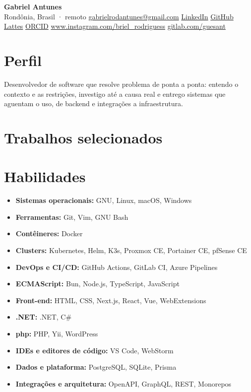 \documentclass[a4paper,10pt]{article}
\begin{document}
\begin{center}
    {\LARGE \textbf{Gabriel Antunes}}
    \\ [0.1cm]
    Rondônia, Brasil · remoto
    {\textbullet}
    \href{mailto:gabrielrodantunes@gmail.com}{gabrielrodantunes@gmail.com}
    {\textbullet}
    \href{https://linkedin.com/in/gabrielrodantunes}{LinkedIn}
    {\textbullet}
    \href{https://github.com/guesant}{GitHub}
    {\textbullet}
    \href{http://lattes.cnpq.br/5981427817317311}{Lattes}
    {\textbullet}
    \href{https://orcid.org/0009-0009-0221-943X}{ORCID}
    {\textbullet}
    \href{https://www.instagram.com/briel_rodriguess}{www.instagram.com/briel\_rodriguess}
    {\textbullet}
    \href{https://gitlab.com/guesant}{gitlab.com/guesant}
\end{center}

\section{Perfil}
    Desenvolvedor de software que resolve problema de ponta a ponta: entendo o contexto e as restrições, investigo até a causa real e entrego sistemas que aguentam o uso, de backend e integrações a infraestrutura.



\section{Trabalhos selecionados}
    

\section{Habilidades}
    \begin{itemize}
                \item \textbf{Sistemas operacionais:} GNU, Linux, macOS, Windows
        \item \textbf{Ferramentas:} Git, Vim, GNU Bash
        \item \textbf{Contêineres:} Docker
        \item \textbf{Clusters:} Kubernetes, Helm, K3s, Proxmox CE, Portainer CE, pfSense CE
        \item \textbf{DevOps e CI/CD:} GitHub Actions, GitLab CI, Azure Pipelines
        \item \textbf{ECMAScript:} Bun, Node.js, TypeScript, JavaScript
        \item \textbf{Front-end:} HTML, CSS, Next.js, React, Vue, WebExtensions
        \item \textbf{.NET:} .NET, C\#
        \item \textbf{php:} PHP, Yii, WordPress
        \item \textbf{IDEs e editores de código:} VS Code, WebStorm
        \item \textbf{Dados e plataforma:} PostgreSQL, SQLite, Prisma
        \item \textbf{Integrações e arquitetura:} OpenAPI, GraphQL, REST, Monorepos
    \end{itemize}
\end{document}
